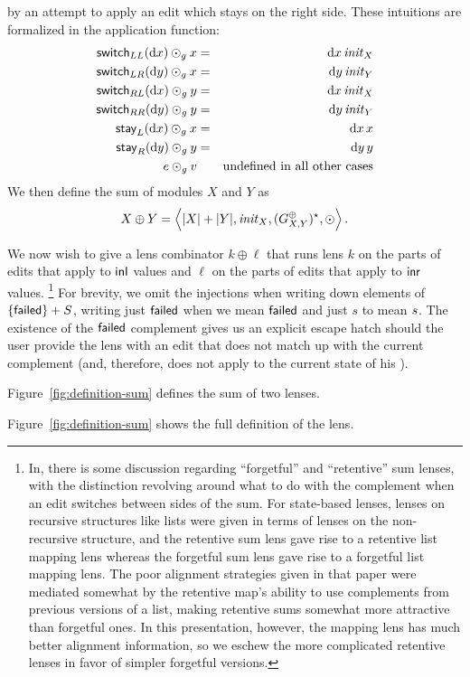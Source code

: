 by an attempt to apply an edit which stays on the right
side. These intuitions are formalized in the application function:
\begin{eqnarray*}
    \mathsf{switch}_{LL}(\textrm{d} x)\odot_g x &=& {\textrm{d} x\,\mathit{init}_X} \\
    \mathsf{switch}_{LR}(\textrm{d} y)\odot_g x &=& {\textrm{d} y\,\mathit{init}_Y} \\
    \mathsf{switch}_{RL}(\textrm{d} x)\odot_g y &=& {\textrm{d} x\,\mathit{init}_X} \\
    \mathsf{switch}_{RR}(\textrm{d} y)\odot_g y &=& {\textrm{d} y\,\mathit{init}_Y} \\
    \mathsf{stay}_L(\textrm{d} x)\odot_g x &=& {\textrm{d} x\,x} \\
    \mathsf{stay}_R(\textrm{d} y)\odot_g y &=& {\textrm{d} y\,y} \\
    e \odot_g v && \mbox{undefined in all other cases}
\end{eqnarray*}
We then define the sum of modules $X$ and $Y$ as
\[X \oplus Y =
\left<|X|+|Y|,\mlinl{\init_X},(G^\oplus_{X,Y})\LIST,\odot\right>.\]

We now wish to give a lens combinator $k\oplus\ell$ that runs lens $k$ on
the parts of edits that apply to $\mathsf{inl}$ values and $\ell$ on
the parts of edits that apply to $\mathsf{inr}$ values.%
\footnote{\label{footnoteseven}%
In\symmlenses, there is some discussion regarding
``forgetful'' and ``retentive'' sum lenses, with the distinction revolving
around what to do with the complement when an edit switches between sides of
the sum. For state-based lenses, lenses on recursive structures like lists
were given in terms of lenses on the non-recursive structure, and the
retentive sum lens gave rise to a retentive list mapping lens whereas the
forgetful sum lens gave rise to a forgetful list mapping lens. The poor
alignment strategies given in that paper were mediated somewhat by the
retentive map's ability to use complements from previous versions of a list,
making retentive sums somewhat more attractive than forgetful ones. In this
presentation, however, the mapping lens has much better alignment
information, so we eschew the more complicated retentive lenses in favor of
simpler forgetful versions.
}
\iffailed
For brevity, we omit the injections when writing down elements of
$\{\mathsf{failed}\}+S$, writing just $\mathsf{failed}$ when we mean $\mathsf{failed}$
and just $s$ to mean $ s$. The existence of the $\mathsf{failed}$ complement
gives us an explicit escape hatch should the user provide the lens with an
edit that does not match up with the current complement (and, therefore,
does not apply to the current state of his \replica). 
\fi
\iffull
\begin{defn}[Sum]
Figure~\ref{fig:definition-sum} defines the sum of two lenses. 
\end{defn}
\else
Figure~\ref{fig:definition-sum} shows the full definition\iffull{} of the
lens.\fi

